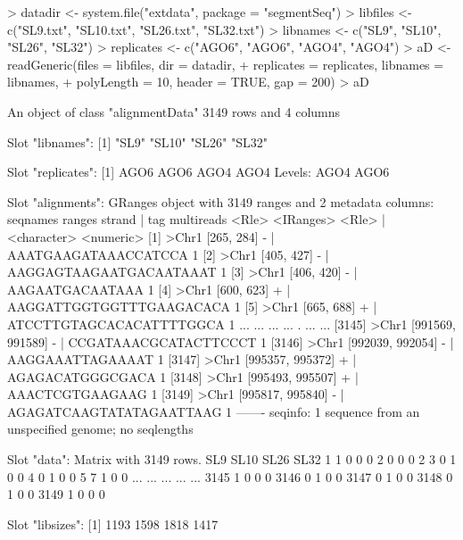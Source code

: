 \documentclass[a4paper]{article}
\begin{document}
\begin{Schunk}
\begin{Sinput}
> datadir <- system.file("extdata", package = "segmentSeq")
> libfiles <- c("SL9.txt", "SL10.txt", "SL26.txt", "SL32.txt")
> libnames <- c("SL9", "SL10", "SL26", "SL32")
> replicates <- c("AGO6", "AGO6", "AGO4", "AGO4")
> aD <- readGeneric(files = libfiles, dir = datadir,
+                   replicates = replicates, libnames = libnames,                   
+                   polyLength = 10, header = TRUE, gap = 200)
> aD
\end{Sinput}
\begin{Soutput}
An object of class "alignmentData"
3149 rows and 4 columns

Slot "libnames":
[1] "SL9"  "SL10" "SL26" "SL32"

Slot "replicates":
[1] AGO6 AGO6 AGO4 AGO4
Levels: AGO4 AGO6

Slot "alignments":
GRanges object with 3149 ranges and 2 metadata columns:
         seqnames           ranges strand |                      tag multireads
            <Rle>        <IRanges>  <Rle> |              <character>  <numeric>
     [1]    >Chr1       [265, 284]      - |     AAATGAAGATAAACCATCCA          1
     [2]    >Chr1       [405, 427]      - |  AAGGAGTAAGAATGACAATAAAT          1
     [3]    >Chr1       [406, 420]      - |          AAGAATGACAATAAA          1
     [4]    >Chr1       [600, 623]      + | AAGGATTGGTGGTTTGAAGACACA          1
     [5]    >Chr1       [665, 688]      + | ATCCTTGTAGCACACATTTTGGCA          1
     ...      ...              ...    ... .                      ...        ...
  [3145]    >Chr1 [991569, 991589]      - |    CCGATAAACGCATACTTCCCT          1
  [3146]    >Chr1 [992039, 992054]      - |         AAGGAAATTAGAAAAT          1
  [3147]    >Chr1 [995357, 995372]      + |         AGAGACATGGGCGACA          1
  [3148]    >Chr1 [995493, 995507]      + |          AAACTCGTGAAGAAG          1
  [3149]    >Chr1 [995817, 995840]      - | AGAGATCAAGTATATAGAATTAAG          1
  -------
  seqinfo: 1 sequence from an unspecified genome; no seqlengths

Slot "data":
Matrix with  3149  rows.
     SL9 SL10 SL26 SL32
1      1    0    0    0
2      0    0    0    2
3      0    1    0    0
4      0    1    0    0
5      7    1    0    0
...  ...  ...  ...  ...
3145   1    0    0    0
3146   0    1    0    0
3147   0    1    0    0
3148   0    1    0    0
3149   1    0    0    0

Slot "libsizes":
[1] 1193 1598 1818 1417
\end{Soutput}
\end{Schunk}
\end{document}
